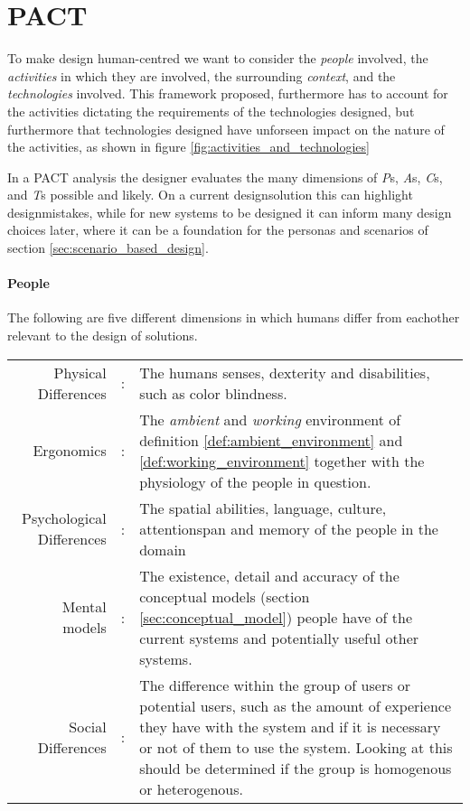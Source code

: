 \section{PACT} \label{sec:pact} 

To make design human-centred we want to consider the \emph{people} involved, the \emph{activities} in which they are involved, the surrounding \emph{context}, and the \emph{technologies} involved. This framework proposed, furthermore has to account for the activities dictating the requirements of the technologies designed, but furthermore that technologies designed have unforseen impact on the nature of the activities, as shown in figure \ref{fig:activities_and_technologies} \cite[p. 25-26]{benyon14}

In a PACT analysis the designer evaluates the many dimensions of \emph{P}s, \emph{A}s, \emph{C}s, and \emph{T}s possible and likely. On a current designsolution this can highlight designmistakes, while for new systems to be designed it can inform many design choices later, where it can be a foundation for the personas and scenarios of section \ref{sec:scenario_based_design}.

\paragraph{People}
The following are five different dimensions in which humans differ from eachother relevant to the design of solutions. \cite[p. 27-30]{benyon14}

\noindent
\begin{longtable}{rc>{\raggedright\arraybackslash}p{}}
  Physical Differences & : &
  The humans senses, dexterity and disabilities, such as color blindness.
  \\
  Ergonomics & : &
  The \emph{ambient} and \emph{working} environment of definition \ref{def:ambient_environment} and \ref{def:working_environment} together with the physiology of the people in question.
  \\
  Psychological Differences & : &
  The spatial abilities, language, culture, attentionspan and memory of the people in the domain
  \\
  Mental models & : &
  The existence, detail and accuracy of the conceptual models (section \ref{sec:conceptual_model}) people have of the current systems and potentially useful other systems.
  \\
  Social Differences & : &
  The difference within the group of users or potential users, such as the amount of experience they have with the system and if it is necessary or not of them to use the system. Looking at this should be determined if the group is homogenous or heterogenous. 
\end{longtable}

